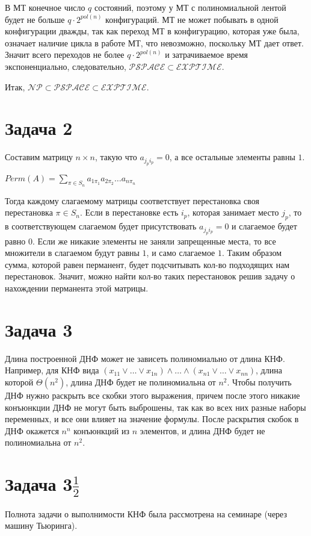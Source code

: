 \documentclass[a4paper,12pt]{article} %
\begin{document}
В МТ конечное число $q$ состояний, поэтому у МТ с полиномиальной лентой будет не больше $q\cdot 2^{pol(n)}$ конфигураций. МТ не может побывать в одной конфигурации дважды, так как переход МТ в конфигурацию, которая уже была, означает наличие цикла в работе МТ, что невозможно, поскольку МТ дает ответ. Значит всего переходов не более $q\cdot 2^{pol(n)}$ и затрачиваемое время экспоненциально, следовательно, $\mathcal{PSPACE}\subset\mathcal{EXPTIME}$.

Итак, $\mathcal{NP}\subset\mathcal{PSPACE}\subset\mathcal{EXPTIME}$.

\section{Задача 2}
\hspace{5mm}
Составим матрицу $n\times n$, такую что $a_{j_p i_p}=0$, а все остальные элементы равны $1$. 

$Perm(A)=\sum\limits_{\pi\in S_n}a_{1\pi_1}a_{2\pi_2}\ldots a_{n\pi_n}$

Тогда каждому слагаемому матрицы соответствует перестановка своя перестановка $\pi\in S_n$. Если в перестановке есть $i_p$, которая занимает место $j_p$, то в соответствующем слагаемом будет присутствовать $a_{j_p i_p}=0$ и слагаемое будет равно $0$. Если же никакие элементы не заняли запрещенные места, то все множители в слагаемом будут равны $1$, и само слагаемое $1$. Таким образом сумма, которой равен перманент, будет подсчитывать кол-во подходящих нам перестановок. Значит, можно найти кол-во таких перестановок решив задачу о нахождении перманента этой матрицы.



\section{Задача 3}
\hspace{5mm}
Длина построенной ДНФ может не зависеть полиномиально от длина КНФ. Например, для КНФ вида $(x_{11}\vee\ldots\vee x_{1n})\wedge\ldots\wedge(x_{n1}\vee\ldots\vee x_{nn})$, длина которой $\Theta(n^2)$, длина ДНФ будет не полиномиальна от $n^2$. Чтобы получить ДНФ нужно раскрыть все скобки этого выражения, причем после этого никакие конъюнкции ДНФ не могут быть выброшены, так как во всех них разные наборы переменных, и все они влияет на значение формулы. После раскрытия скобок в ДНФ окажется $n^n$ конъюнкций из $n$ элементов, и длина ДНФ будет не полиномиальна от $n^2$.

\section{Задача 3$\frac{1}{2}$}
\hspace{5mm}
Полнота задачи о выполнимости КНФ была рассмотрена на семинаре (через машину Тьюринга). 
\end{document}
